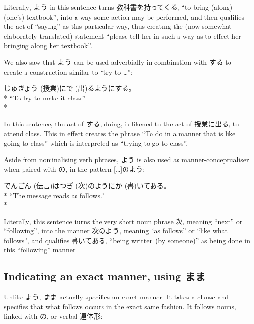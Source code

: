 \documentclass[11pt, b5paper, twoside, openright, onecolumn]{book}
\makeatletter
\newcommand*{\rubystack}[2]{{\relscale{0.5}%
  \begin{tabular}[b]{@{}c@{}}%
    {#1}\\%
   {\textscale{2}{#2}}%
  \end{tabular}}%
}
\DeclareRobustCommand*{\ruby}[2]{%
  \mbox{%
    \setlength{\parskip}{0ex}%
    \BeginAccSupp{method=pdfstringdef,ActualText={#1}}%
      \rubystack{\phantom{#2}}{#1}%
      \llap{%
        \rubystack{#2}{\phantom{#1}}%
      }%
    \EndAccSupp{}%
  }%
}
\renewcommand*{\ruby}[2]{#2 (#1)}%
\newenvironment{exampleblock}{
\setlength{\parindent}{0.6in}
\begin{minipage}[t]{\dimexpr\textwidth-\parindent}}
{\end{minipage}}
\makeatother
\begin{document}
Literally‚ よう in this sentence turns 教科書を持ってくる‚ “to bring (along) (one’s) textbook”‚ into a way some action may be performed‚ and then qualifies the act of “saying” as this particular way‚ thus creating the (now somewhat elaborately translated) statement “please tell her in such a way as to effect her bringing along her textbook”.

We also saw that よう can be used adverbially in combination with する to create a construction similar to “try to …”:

\vspace{0.4cm}
\begin{exampleblock}
\ruby{授業}{じゅぎょう}に\ruby{出}{で}るようにする。 \\* 
“To try to make it class.” \\* 
\end{exampleblock}
\vspace{0.2cm}

In this sentence‚ the act of する‚ doing‚ is likened to the act of 授業に出る‚ to attend class. This in effect creates the phrase “To do in a manner that is like going to class” which is interpreted as “trying to go to class”.

Aside from nominalising verb phrases‚ よう is also used as manner-conceptualiser when paired with の‚ in the pattern […]のよう:

\vspace{0.4cm}
\begin{exampleblock}
\ruby{伝言}{でんごん}は\ruby{次}{つぎ}のように\ruby{書}{か}いてある。 \\* 
“The message reads as follows.” \\* 
\end{exampleblock}
\vspace{0.2cm}

Literally‚ this sentence turns the very short noun phrase 次‚ meaning “next” or “following”‚ into the manner 次のよう‚ meaning “as follows” or “like what follows”‚ and qualifies 書いてある‚ “being written (by someone)” as being done in this “following” manner.

\subsection{Indicating an exact manner‚ using まま}

Unlike よう‚ まま actually specifies an exact manner. It takes a clause and specifies that what follows occurs in the exact same fashion. It follows nouns‚ linked with の‚ or verbal 連体形:
\end{document}
